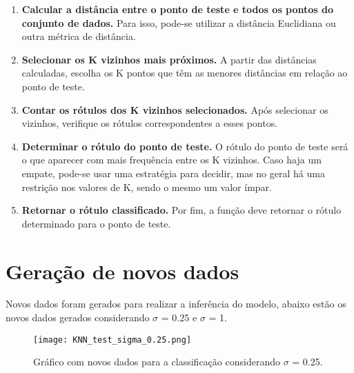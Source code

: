 \documentclass{article} %
\begin{document}
\vspace{1cm}

\begin{enumerate}
    \item \textbf{Calcular a distância entre o ponto de teste e todos os pontos do conjunto de dados.} Para isso, pode-se utilizar a distância Euclidiana ou outra métrica de distância.
    
    \item \textbf{Selecionar os K vizinhos mais próximos.} A partir das distâncias calculadas, escolha os K pontos que têm as menores distâncias em relação ao ponto de teste.
    
    \item \textbf{Contar os rótulos dos K vizinhos selecionados.} Após selecionar os vizinhos, verifique os rótulos correspondentes a esses pontos.
    
    \item \textbf{Determinar o rótulo do ponto de teste.} O rótulo do ponto de teste será o que aparecer com mais frequência entre os K vizinhos. Caso haja um empate, pode-se usar uma estratégia para decidir, mas no geral há uma restrição nos valores de K, sendo o mesmo um valor ímpar.
    
    \item \textbf{Retornar o rótulo classificado.} Por fim, a função deve retornar o rótulo determinado para o ponto de teste.
\end{enumerate}

\section{Geração de novos dados}

Novos dados foram gerados para realizar a inferência do modelo, abaixo estão os novos dados gerados considerando $\sigma$ = 0.25 e $\sigma$ = 1.

\vspace{1cm}

\begin{figure}[h] %
    \centering %
    \texttt{[image: KNN\_test\_sigma\_0.25.png]} %
    \caption{Gráfico com novos dados para a classificação considerando $\sigma$ = 0.25.} %
    \label{fig:exemplo} %
\end{figure}
\end{document}
